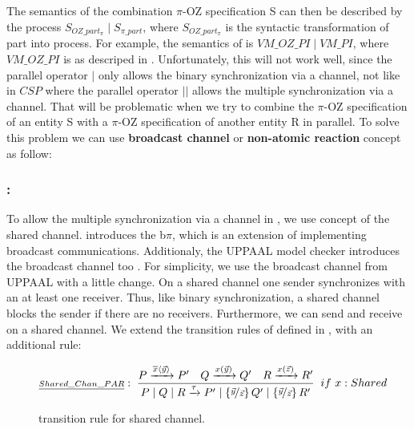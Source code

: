 The semantics of the combination $\pi$-OZ specification S can then be described by the \picalc{} process $S_{OZ\_part_\pi} \mid S_{\pi\_part}$, where $S_{OZ\_part_\pi}$ is the syntactic transformation of \oz{} part into \picalc{} process. For example, the semantics of  is $VM\_OZ\_PI \mid VM\_PI$, where $VM\_OZ\_PI$ is as descriped in . Unfortunately, this will not work well, since the parallel operator $|$ only allows the binary synchronization via a channel, not like in $CSP$ where the parallel operator $||$ allows the multiple synchronization via a channel. That will be problematic when we try to combine the $\pi$-OZ specification of an entity S with a $\pi$-OZ specification of another entity R in parallel. To solve this problem we can use \textbf{broadcast channel} or  \textbf{non-atomic reaction} concept as follow:

\subsubsection{:}
To allow the multiple synchronization via a channel in \picalc{}, we use concept of the shared channel. \cite{ene} introduces the b$\pi$, which is an extension of \picalc{} implementing broadcast communications. Additionaly, the UPPAAL model checker introduces the broadcast channel too \cite{olderog08}. For simplicity, we use the broadcast channel from UPPAAL with a little change. On a shared channel one sender synchronizes with an at least one receiver. Thus, like binary synchronization, a shared channel blocks the sender if there are no receivers. Furthermore, we can send and receive on a shared channel. We extend the transition rules of \picalc{} defined in , with an additional rule:
\begin{figure}[H]
\begin{gather*}
\kalRuleM[if\ x: Shared]{Shared\_Chan\_PAR}{}{P \transs{\out{x}{\vec{y}}} P'}{Q \transs{\inp{x}{\vec{y}}} Q'}{R \transs{\inp{x}{\vec{z}}} R'}{\procpar{\procpar{P}{Q}}{R} \transs{\tau} 
\procpar{P'}{\procpar{\substitue{\vec{y}}{\vec{z}}Q'}{\substitue{\vec{y}}{\vec{z}}R'}}
}
\end{gather*}
\caption{transition rule for shared channel.}
\label{fig_broadcast_channel}
\end{figure}



